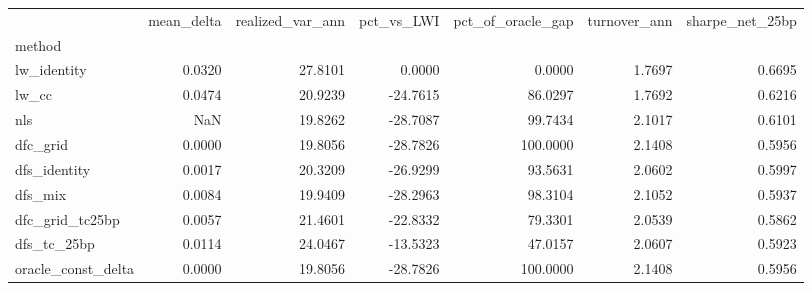 \begin{tabular}{lrrrrrr}
\toprule
 & mean_delta & realized_var_ann & pct_vs_LWI & pct_of_oracle_gap & turnover_ann & sharpe_net_25bp \\
method &  &  &  &  &  &  \\
\midrule
lw_identity & 0.0320 & 27.8101 & 0.0000 & 0.0000 & 1.7697 & 0.6695 \\
lw_cc & 0.0474 & 20.9239 & -24.7615 & 86.0297 & 1.7692 & 0.6216 \\
nls & NaN & 19.8262 & -28.7087 & 99.7434 & 2.1017 & 0.6101 \\
dfc_grid & 0.0000 & 19.8056 & -28.7826 & 100.0000 & 2.1408 & 0.5956 \\
dfs_identity & 0.0017 & 20.3209 & -26.9299 & 93.5631 & 2.0602 & 0.5997 \\
dfs_mix & 0.0084 & 19.9409 & -28.2963 & 98.3104 & 2.1052 & 0.5937 \\
dfc_grid_tc25bp & 0.0057 & 21.4601 & -22.8332 & 79.3301 & 2.0539 & 0.5862 \\
dfs_tc_25bp & 0.0114 & 24.0467 & -13.5323 & 47.0157 & 2.0607 & 0.5923 \\
oracle_const_delta & 0.0000 & 19.8056 & -28.7826 & 100.0000 & 2.1408 & 0.5956 \\
\bottomrule
\end{tabular}
